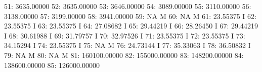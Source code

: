 \documentclass[nojss]{jss}
\begin{document}
\begin{Schunk}
\begin{Soutput}
 51:                 3635.00000                                           
 52:                 3635.00000                                           
 53:                 3646.00000                                           
 54:                 3089.00000                                           
 55:                 3110.00000                                           
 56:                 3138.00000                                           
 57:                 3199.00000                                           
 58:                 3941.00000                                           
 59:                         NA                                          M
 60:                         NA                                          M
 61:                   23.55375                                          I
 62:                   23.55375                                          I
 63:                   23.55375                                          I
 64:                   27.08682                                          I
 65:                   29.44219                                          I
 66:                   28.26450                                          I
 67:                   29.44219                                          I
 68:                   30.61988                                          I
 69:                   31.79757                                          I
 70:                   32.97526                                          I
 71:                   23.55375                                          I
 72:                   23.55375                                          I
 73:                   34.15294                                          I
 74:                   23.55375                                          I
 75:                         NA                                          M
 76:                   24.73144                                          I
 77:                   35.33063                                          I
 78:                   36.50832                                          I
 79:                         NA                                          M
 80:                         NA                                          M
 81:               160100.00000                                           
 82:               155000.00000                                           
 83:               148200.00000                                           
 84:               138600.00000                                           
 85:               126000.00000                                           

\end{Soutput}
\end{Schunk}
\end{document}
